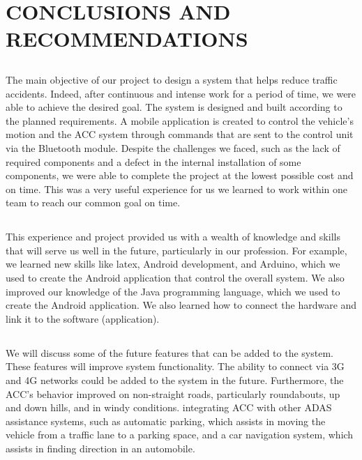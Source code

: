\documentclass[12pt,a4paper]{report}
\begin{document}
\chapter{CONCLUSIONS AND RECOMMENDATIONS}

\section{\fontsize{12}{12}\selectfont{Summary of Achievements of the Project Objectives}}
The main objective of our project to design a system that helps reduce traffic accidents. Indeed, after continuous and intense work for a period of time, we were able to achieve the desired goal. The system is designed and built according to the planned requirements. A mobile application is created to control the vehicle's motion and the ACC system through commands that are sent to the control unit via the Bluetooth module. Despite the challenges we faced, such as the lack of required components and a defect in the internal installation of some components, we were able to complete the project at the lowest possible cost and on time. This was a very useful experience for us we learned to work within one team to reach our common goal on time.

\section{\fontsize{12}{12}\selectfont{New Skills and Experiences Learnt}}
This experience and project provided us with a wealth of knowledge and skills that will serve us well in the future, particularly in our profession. For example, we learned new skills like latex, Android development, and Arduino, which we used to create the Android application that control the overall system. We also improved our knowledge of the Java programming language, which we used to create the Android application. We also learned how to connect the hardware and link it to the software (application).


\section{\fontsize{12}{12}\selectfont{Recommendations for Future Work}}
We will discuss some of the future features that can be added to the system. These features will improve system functionality. The ability to connect via 3G and 4G networks could be added to the system in the future. Furthermore, the ACC's behavior improved on non-straight roads, particularly roundabouts, up and down hills, and in windy conditions. integrating ACC with other ADAS assistance systems, such as automatic parking, which assists in moving the vehicle from a traffic lane to a parking space, and a car navigation system, which assists in finding direction in an automobile.
\end{document}
